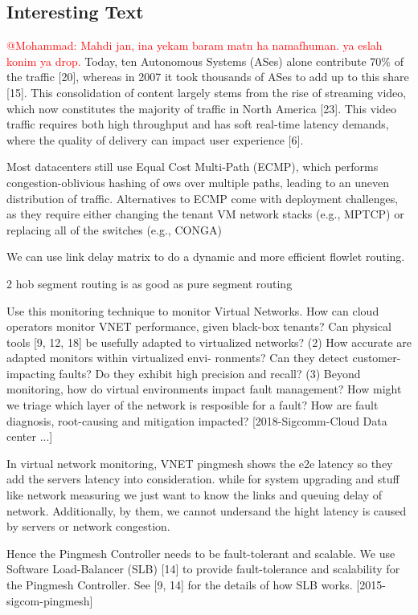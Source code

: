 \documentclass[10pt, journal, letterpaper]{IEEEtran}
\begin{document}
\subsection{Interesting Text}
\textcolor{red}{@Mohammad: Mahdi jan, ina yekam baram matn ha namafhuman. ya eslah konim ya drop.}
Today, ten Autonomous Systems (ASes) alone contribute 70$\%$ of the traffic [20], whereas in 2007 it took thousands of ASes to add up to this share [15]. This consolidation of content largely stems from the rise of streaming video, which now constitutes the majority of traffic in North America [23]. This video traffic requires both high throughput and has soft real-time latency demands, where the quality of delivery can impact user experience [6].\cite{schlinker2017engineering}

Most datacenters still use Equal Cost Multi-Path (ECMP), which performs congestion-oblivious hashing of  ows over multiple paths, leading to an uneven distribution of traffic. Alternatives to ECMP come with deployment challenges, as they require either changing the tenant VM network stacks (e.g., MPTCP) or replacing all of the switches (e.g., CONGA)

We can use link delay matrix to do a dynamic and more efficient flowlet routing.

2 hob segment routing is as good as pure segment routing\cite{bhatia2015optimized}

Use this monitoring technique to monitor Virtual Networks. How can cloud operators monitor VNET performance, given black-box tenants? Can physical tools [9, 12, 18] be usefully adapted to virtualized networks?
(2) How accurate are adapted monitors within virtualized envi- ronments? Can they detect customer-impacting faults? Do they exhibit high precision and recall?
(3) Beyond monitoring, how do virtual environments impact fault management? How might we triage which layer of the network is resposible for a fault? How are fault diagnosis, root-causing and mitigation impacted?
[2018-Sigcomm-Cloud Data center ...]

In virtual network monitoring, VNET pingmesh shows the e2e latency so they add the servers latency into consideration. while for system upgrading and stuff like network measuring we just want to know the links and queuing delay of network. Additionally, by them, we cannot undersand the hight latency is caused by servers or network congestion.

Hence the Pingmesh Controller needs to be fault-tolerant and scalable. We use Software Load-Balancer (SLB) [14] to provide fault-tolerance and scalability for the Pingmesh Controller. See [9, 14] for the details of how SLB works. [2015-sigcom-pingmesh]
\end{document}
